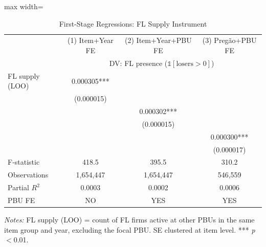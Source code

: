 \begin{table}[htbp]
\centering
\caption{First-Stage Regressions: FL Supply Instrument}
\label{tab:iv_first_stage}
\begin{adjustbox}{max width=\textwidth}
\begin{threeparttable}
\small
\begin{tabular}{lccc}
\toprule
 & (1) Item+Year FE & (2) Item+Year+PBU FE & (3) Preg\~{a}o+PBU FE \\ %
 & \multicolumn{3}{c}{DV: FL presence ($\mathbb{1}[\text{losers} > 0]$)} \\
\midrule
FL supply (LOO) & 0.000305*** & & \\
 & (0.000015) & & \\
 & & 0.000302*** & \\
 & & (0.000015) & \\
 & & & 0.000300*** \\
 & & & (0.000017) \\
\midrule
F-statistic & 418.5 & 395.5 & 310.2 \\
Observations & 1,654,447 & 1,654,447 & 546,559 \\
Partial $R^2$ & 0.0003 & 0.0002 & 0.0006 \\
PBU FE & NO & YES & YES \\
\bottomrule
\end{tabular}
\begin{tablenotes}
\small
\item \textit{Notes:} FL supply (LOO) = count of FL firms active at other PBUs
in the same item group and year, excluding the focal PBU.
SE clustered at item level. *** \textit{p}$<$0.01.
\end{tablenotes}
\end{threeparttable}
\end{adjustbox}
\end{table}
